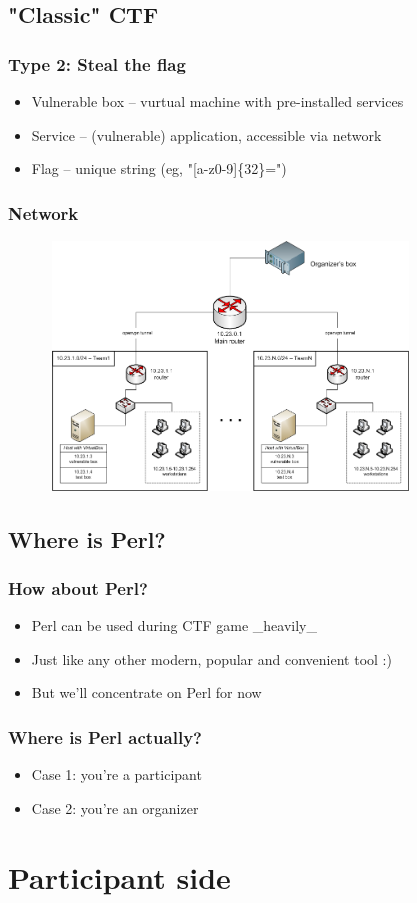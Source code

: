 \documentclass{beamer}
\begin{document}
\subsection{"Classic" CTF}
\frame
{
\frametitle{Type 2: Steal the flag}
\begin{itemize}
\item Vulnerable box -- vurtual machine with pre-installed services
\item Service -- (vulnerable) application, accessible via network
\item Flag -- unique string (eg, "[a-z0-9]\{32\}=")
\end{itemize}
}

\frame
{
\frametitle{Network}
\begin{figure}
\includegraphics[width=3.8in,height=2.6in]{pics/network.png}
\end{figure}
}

\subsection{Where is Perl?}
\frame
{
\frametitle{How about Perl?}
\begin{itemize}
\item<1-> Perl can be used during CTF game \_heavily\_
\item<2-> Just like any other modern, popular and convenient tool :)
\item<3-> But we'll concentrate on Perl for now
\end{itemize}
}

\frame
{
\frametitle{Where is Perl actually?}
\begin{itemize}
\item Case 1: you're a participant
\item Case 2: you're an organizer
\end{itemize}
}

\section{Participant side}
\end{document}
